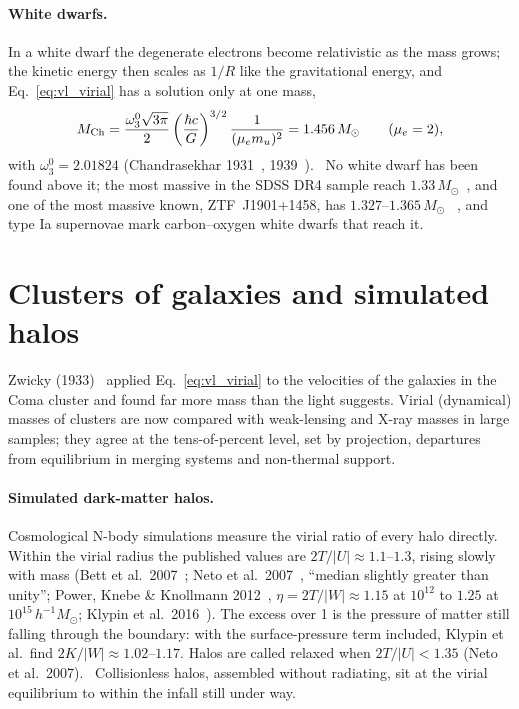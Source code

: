 \paragraph{White dwarfs.} In a white dwarf the degenerate electrons become relativistic as the mass grows; the kinetic energy then scales as $1/R$ like the
gravitational energy, and Eq.~\eqref{eq:vl_virial} has a solution only at one mass,
\begin{equation}
M_{\rm Ch}=\frac{\omega_3^0\sqrt{3\pi}}{2}\left(\frac{\hbar c}{G}\right)^{3/2}\frac{1}{(\mu_em_u)^2}=1.456\,M_\odot\qquad(\mu_e=2),\label{eq:vl_chandra}
\end{equation}
with $\omega_3^0=2.01824$ (Chandrasekhar 1931~\cite{Chandrasekhar1931}, 1939~\cite{Chandrasekhar1939}). \derived\ No white dwarf has been found above it; the
most massive in the SDSS DR4 sample reach $1.33\,M_\odot$~\cite{Kepler2007}, and one of the most massive known, ZTF~J1901+1458, has $1.327$--$1.365\,M_\odot$~\cite{Caiazzo2021} \observed, and type Ia supernovae mark carbon--oxygen white dwarfs that reach it.

\section{Clusters of galaxies and simulated halos}\label{sec:vl_clusters}
Zwicky (1933)~\cite{Zwicky1933} applied Eq.~\eqref{eq:vl_virial} to the velocities of the galaxies in the Coma cluster and found far more mass than the
light suggests. Virial (dynamical) masses of clusters are now compared with weak-lensing and X-ray masses in large samples; they agree at the
tens-of-percent level, set by projection, departures from equilibrium in merging systems and non-thermal support. \observed

\paragraph{Simulated dark-matter halos.} Cosmological N-body simulations measure the virial ratio of every halo directly. Within the virial radius the
published values are $2T/|U|\approx1.1$--$1.3$, rising slowly with mass (Bett et al.\ 2007~\cite{Bett2007}; Neto et al.\ 2007~\cite{Neto2007}, ``median
slightly greater than unity''; Power, Knebe \& Knollmann 2012~\cite{Power2012}, $\eta=2T/|W|\approx1.15$ at $10^{12}$ to $1.25$ at
$10^{15}\,h^{-1}M_\odot$; Klypin et al.\ 2016~\cite{Klypin2016}). The excess over 1 is the pressure of matter still falling through the boundary: with the
surface-pressure term included, Klypin et al.\ find $2K/|W|\approx1.02$--$1.17$. Halos are called relaxed when $2T/|U|<1.35$ (Neto et al.\ 2007). \observed\
Collisionless halos, assembled without radiating, sit at the virial equilibrium to within the infall still under way.

